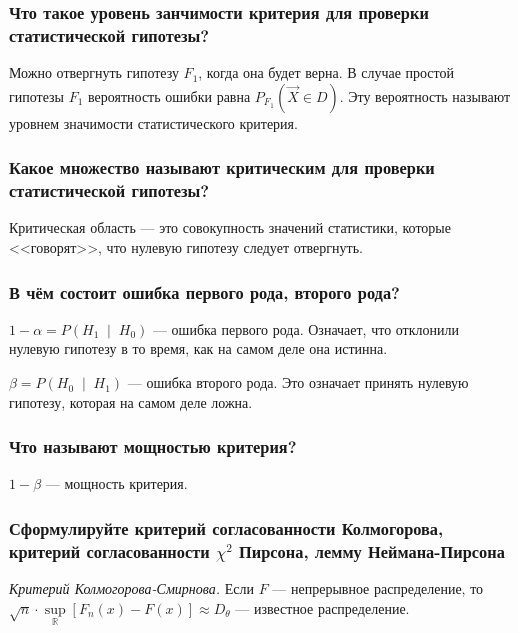 \subsubsection*{Что такое уровень занчимости критерия для проверки статистической гипотезы?}

Можно отвергнуть гипотезу $F_1$, когда она будет верна.
В случае простой гипотезы $F_1$ вероятность ошибки равна  $P_{F_1} \left( \vec{X} \in D \right) $.
Эту вероятность называют уровнем значимости статистического критерия.

\subsubsection*{Какое множество называют критическим для проверки статистической гипотезы?}

Критическая область --- это совокупность значений статистики, которые <<говорят>>,
что нулевую гипотезу следует отвергнуть.

\subsubsection*{В чём состоит ошибка первого рода, второго рода?}

$1 - \alpha = P \left( H_1 \; \middle| \; H_0 \right) $ --- ошибка первого рода.
Означает, что отклонили нулевую гипотезу в то время, как на самом деле она истинна.

$ \beta = P \left( H_0 \; \middle| \; H_1 \right) $ --- ошибка второго рода.
Это означает принять нулевую гипотезу, которая на самом деле ложна.

\subsubsection*{Что называют мощностью критерия?}

$1 - \beta $ --- мощность критерия.

\subsubsection*{Сформулируйте критерий согласованности Колмогорова,
                критерий согласованности $ \chi^2$ Пирсона, лемму Неймана-Пирсона}

\textit{Критерий Колмогорова-Смирнова.}
Если $F$ --- непрерывное распределение,
то
$ \sqrt{n} \cdot
  \sup \limits_{ \mathbb{R}} \left[ F_n \left( x \right) - F \left( x \right) \right] \approx
  D_{ \theta }$
--- известное распределение.

